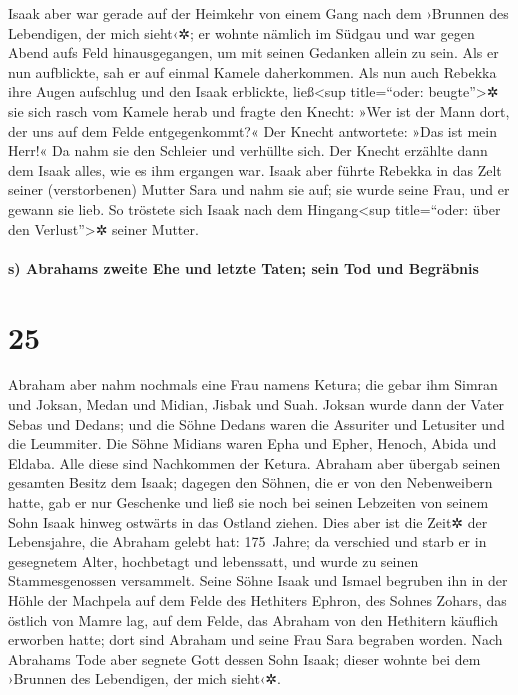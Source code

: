  Isaak aber war gerade auf der Heimkehr von einem Gang
nach dem ›Brunnen des Lebendigen, der mich sieht‹✲; er wohnte nämlich im
Südgau  und war gegen Abend aufs Feld hinausgegangen, um
mit seinen Gedanken allein zu sein. Als er nun aufblickte, sah er auf
einmal Kamele daherkommen.  Als nun auch Rebekka ihre
Augen aufschlug und den Isaak erblickte, ließ\textless sup title=``oder:
beugte''\textgreater✲ sie sich rasch vom Kamele herab 
und fragte den Knecht: »Wer ist der Mann dort, der uns auf dem Felde
entgegenkommt?« Der Knecht antwortete: »Das ist mein Herr!« Da nahm sie
den Schleier und verhüllte sich.  Der Knecht erzählte
dann dem Isaak alles, wie es ihm ergangen war.  Isaak
aber führte Rebekka in das Zelt seiner (verstorbenen) Mutter Sara und
nahm sie auf; sie wurde seine Frau, und er gewann sie lieb. So tröstete
sich Isaak nach dem Hingang\textless sup title=``oder: über den
Verlust''\textgreater✲ seiner Mutter.

\hypertarget{s-abrahams-zweite-ehe-und-letzte-taten-sein-tod-und-begruxe4bnis}{%
\paragraph{s) Abrahams zweite Ehe und letzte Taten; sein Tod und
Begräbnis}\label{s-abrahams-zweite-ehe-und-letzte-taten-sein-tod-und-begruxe4bnis}}

\hypertarget{section-24}{%
\section{25}\label{section-24}}

 Abraham aber nahm nochmals eine Frau namens Ketura;
 die gebar ihm Simran und Joksan, Medan und Midian, Jisbak
und Suah.  Joksan wurde dann der Vater Sebas und Dedans;
und die Söhne Dedans waren die Assuriter und Letusiter und die
Leummiter.  Die Söhne Midians waren Epha und Epher,
Henoch, Abida und Eldaba. Alle diese sind Nachkommen der Ketura.
 Abraham aber übergab seinen gesamten Besitz dem Isaak;
 dagegen den Söhnen, die er von den Nebenweibern hatte,
gab er nur Geschenke und ließ sie noch bei seinen Lebzeiten von seinem
Sohn Isaak hinweg ostwärts in das Ostland ziehen.  Dies
aber ist die Zeit✲ der Lebensjahre, die Abraham gelebt hat: 175~Jahre;
 da verschied und starb er in gesegnetem Alter, hochbetagt
und lebenssatt, und wurde zu seinen Stammesgenossen versammelt.
 Seine Söhne Isaak und Ismael begruben ihn in der Höhle
der Machpela auf dem Felde des Hethiters Ephron, des Sohnes Zohars, das
östlich von Mamre lag,  auf dem Felde, das Abraham von
den Hethitern käuflich erworben hatte; dort sind Abraham und seine Frau
Sara begraben worden.  Nach Abrahams Tode aber segnete
Gott dessen Sohn Isaak; dieser wohnte bei dem ›Brunnen des Lebendigen,
der mich sieht‹✲.

